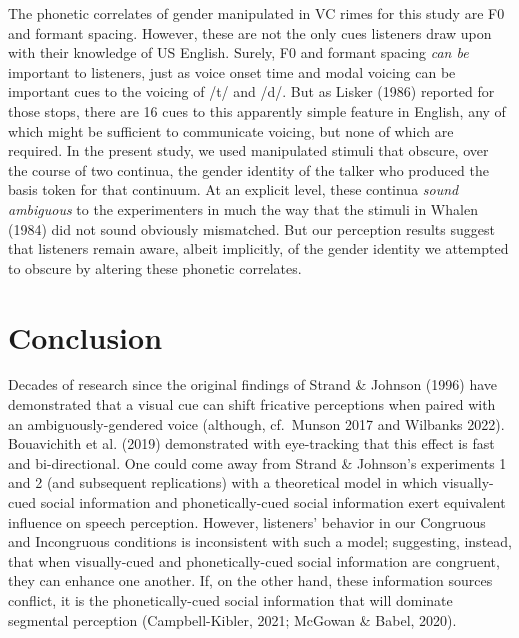 \documentclass[
  letterpaper,
  DIV=11,
  numbers=noendperiod]{scrartcl}
\begin{document}
The phonetic correlates of gender manipulated in VC rimes for this study
are F0 and formant spacing. However, these are not the only cues
listeners draw upon with their knowledge of US English. Surely, F0 and
formant spacing \emph{can be} important to listeners, just as voice
onset time and modal voicing can be important cues to the voicing of /t/
and /d/. But as Lisker (1986) reported for those stops, there are 16
cues to this apparently simple feature in English, any of which might be
sufficient to communicate voicing, but none of which are required. In
the present study, we used manipulated stimuli that obscure, over the
course of two continua, the gender identity of the talker who produced
the basis token for that continuum. At an explicit level, these continua
\emph{sound ambiguous} to the experimenters in much the way that the
stimuli in Whalen (1984) did not sound obviously mismatched. But our
perception results suggest that listeners remain aware, albeit
implicitly, of the gender identity we attempted to obscure by altering
these phonetic correlates.

\section{Conclusion}\label{conclusion}

Decades of research since the original findings of Strand \& Johnson
(1996) have demonstrated that a visual cue can shift fricative
perceptions when paired with an ambiguously-gendered voice (although,
cf.~Munson 2017 and Wilbanks 2022). Bouavichith et al. (2019)
demonstrated with eye-tracking that this effect is fast and
bi-directional. One could come away from Strand \& Johnson's experiments
1 and 2 (and subsequent replications) with a theoretical model in which
visually-cued social information and phonetically-cued social
information exert equivalent influence on speech perception. However,
listeners' behavior in our Congruous and Incongruous conditions is
inconsistent with such a model; suggesting, instead, that when
visually-cued and phonetically-cued social information are congruent,
they can enhance one another. If, on the other hand, these information
sources conflict, it is the phonetically-cued social information that
will dominate segmental perception (Campbell-Kibler, 2021; McGowan \&
Babel, 2020).
\end{document}
